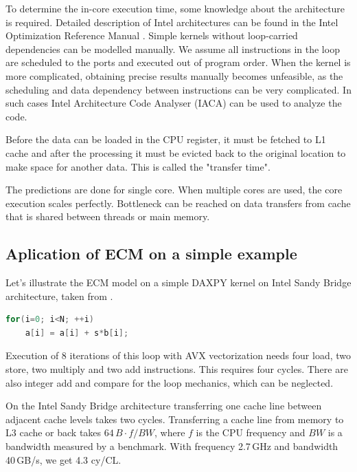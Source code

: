To determine the in-core execution time, some knowledge about the architecture is required. Detailed description of Intel architectures can be found in the Intel Optimization Reference Manual . Simple kernels without loop-carried dependencies can be modelled manually. We assume all instructions in the loop are scheduled to the ports and executed out of program order. 
When the kernel is more complicated, obtaining precise results manually becomes unfeasible, as the scheduling and data dependency between instructions can be very complicated. In such cases Intel Architecture Code Analyser (IACA)  can be used to analyze the code.

Before the data can be loaded in the CPU register, it must be fetched to L1 cache and after the processing it must be evicted back to the original location to make space for another data. This is called  the "transfer time".

The predictions are done for single core. When multiple cores are used, the core execution scales perfectly. Bottleneck can be reached on data transfers from cache that is shared between threads or main memory.

\subsection{Aplication of ECM on a simple example}

Let's illustrate the ECM model on a simple DAXPY kernel on Intel Sandy Bridge architecture, taken from .
\begin{lstlisting}[language=C]
for(i=0; i<N; ++i)
    a[i] = a[i] + s*b[i];
\end{lstlisting}

Execution of 8 iterations of this loop with AVX vectorization needs four load, two store, two multiply and two add instructions. This requires four cycles. There are also integer add and compare for the loop mechanics, which can be neglected.

On the Intel Sandy Bridge architecture transferring one cache line between adjacent cache levels takes two cycles.
Transferring a cache line from memory to L3 cache or back takes $64\,B \cdot f/ BW$, where $f$ is the CPU frequency and $BW$ is a bandwidth measured by a benchmark. With frequency 2.7\,GHz and bandwidth 40\,GB/s, we get 4.3 cy/CL.

